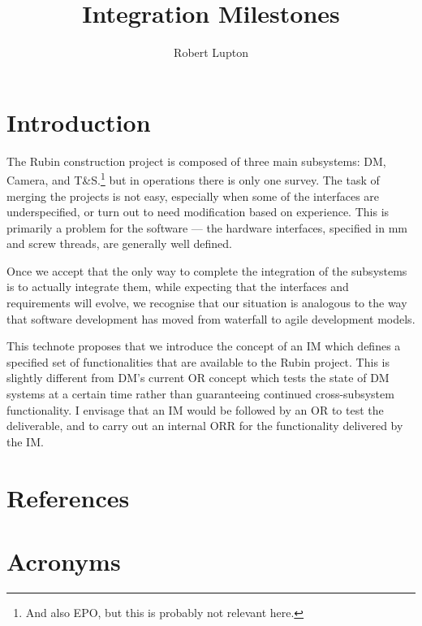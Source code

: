 \documentclass[SE,authoryear,toc]{lsstdoc}
\title{Integration Milestones}
\author{%
Robert Lupton
}
\date{\vcsDate}
\begin{document}
\maketitle

\section{Introduction}

The Rubin construction project is composed of three main subsystems: DM, Camera, and T\&S.\footnote{
  And also EPO, but this is probably not relevant here.}
but in operations there is only one survey.  The task of merging the projects is not easy, especially
when some of the interfaces are underspecified, or turn out to need modification based on experience.
This is primarily
a problem for the software --- the hardware interfaces, specified in mm and screw threads, are generally
well defined.

Once we accept that the only way to complete the integration of the subsystems is to actually integrate them,
while expecting that the interfaces and requirements will evolve, we recognise that our
situation is analogous to the
way that software development has moved from waterfall to agile development models.

This technote proposes that we introduce the concept of an \gls{IM} which defines
a specified set of functionalities that are available to the Rubin project.
This is slightly different from \gls{DM}'s
current \gls{OR} concept which tests the state of DM systems at a certain time rather than guaranteeing
continued cross-subsystem functionality.  I envisage that an \gls{IM} would be followed by an \gls{OR} to test
the deliverable, and to carry out an internal \gls{ORR} for the functionality delivered by the \gls{IM}.

\iffalse



\else
\newcommand{\inputIM}[1]{\vfil\eject}
\inputIM{IMa}
\inputIM{IMb}
\inputIM{IMc}
\inputIM{IMd}
\inputIM{IMe}
\inputIM{IMf}
\inputIM{IMg}
\inputIM{IMh}
\inputIM{IMi}
\inputIM{IMj}
\inputIM{IMk}
\inputIM{IMbacklog}
\fi

\appendix
\section{References} \label{sec:bib}
\renewcommand{\refname}{} %


\section{Acronyms} \label{sec:acronyms}

\printglossaries
\end{document}
